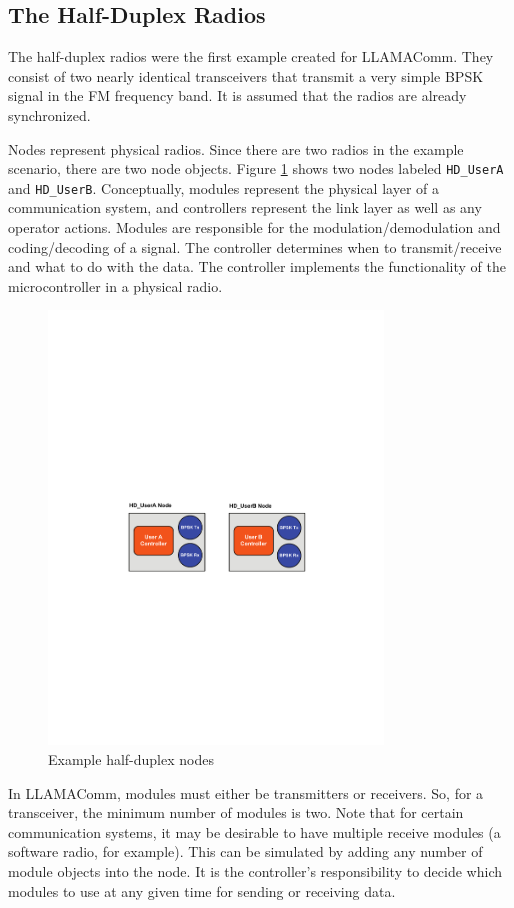 \subsection{The Half-Duplex Radios} \label{sec:hdExample}

The half-duplex radios were the first example created for LLAMAComm.
They consist of two nearly identical transceivers that transmit a
very simple BPSK signal in the FM frequency band.  It is assumed
that the radios are already synchronized.

Nodes represent physical radios.  Since there are two radios in the
example scenario, there are two node objects.  Figure
\ref{fig:hdNodes} shows two nodes labeled \verb+HD_UserA+ and
\verb+HD_UserB+.  Conceptually, modules represent the physical layer
of a communication system, and controllers represent the link layer
as well as any operator actions.  Modules are responsible for the
modulation/demodulation and coding/decoding of a signal.  The
controller determines when to transmit/receive and what to do with
the data.  The controller implements the functionality of the
microcontroller in a physical radio.

\begin{figure}[h]
\centering
\includegraphics[width=3.5in]{figs/HD_Example}
\caption{Example half-duplex nodes} \label{fig:hdNodes}
\end{figure}

In LLAMAComm, modules must either be transmitters or receivers.  So,
for a transceiver, the minimum number of modules is two.  Note that
for certain communication systems, it may be desirable to have
multiple receive modules (a software radio, for example). This can
be simulated by adding any number of module objects into the node.
It is the controller's responsibility to decide which modules to use
at any given time for sending or receiving data.

